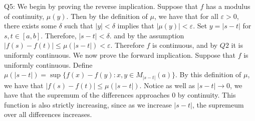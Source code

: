 \documentclass[letterpaper]{article}
\begin{document}
\noindent Q5: 
We begin by proving the reverse implication. Suppose that $f$ has a modulus of continuity, $\mu(y)$. Then by the definition of $\mu$, we have that for all $\varepsilon>0$, there exists some $\delta$ such that $|y|<\delta$ implies that $|\mu(y)|<\varepsilon$. Set $y=|s-t|$ for $s,t\in [a,b]$. Therefore, $|s-t|<\delta$. and by the assumption $|f(s)-f(t)|\leq \mu(|s-t|)<\varepsilon$. Therefore $f$ is continuous, and by $Q2$ it is uniformly continuous. 
We now prove the forward implication. Suppose that $f$ is uniformly continuous. Define $\mu(|s-t|) = \sup\{f(x)-f(y): x,y \in M_{|s-t|}(a) \}$. By this definition of $\mu$, we have that $|f(s)-f(t)|\leq \mu(|s-t|)$. Notice as well as $|s-t| \to 0$, we have that the supremum of the differences approaches 0 by continuity. This function is also strictly increasing, since as we increase $|s-t|$, the supremeum over all differences increases. 
\end{document}
